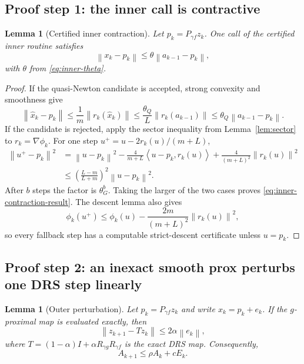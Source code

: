 \documentclass[10pt,leqno]{amsart}
\numberwithin{equation}{section}
\numberwithin{algorithm}{section}
\newtheorem{lemma}[theorem]{Lemma}
\theoremstyle{remark}
\newcommand{\norm}[1]{\left\lVert #1 \right\rVert}
\newcommand{\ip}[2]{\left\langle #1,#2 \right\rangle}
\newcommand{\grad}{\nabla}
\begin{document}
\subsection{Proof step 1: the inner call is contractive}

\begin{lemma}[Certified inner contraction]
\label{lem:certified-inner-contraction}
Let $p_k=P_{\gamma f}z_k$.  One call of the certified inner routine satisfies
\begin{equation}
\label{eq:inner-contraction-result}
    \norm{x_k-p_k}
    \le\theta\norm{a_{k-1}-p_k},
\end{equation}
with $\theta$ from \eqref{eq:inner-theta}.
\end{lemma}

\begin{proof}
If the quasi-Newton candidate is accepted, strong convexity and smoothness give
\[
    \norm{\widehat x_k-p_k}
    \le\frac1m\norm{r_k(\widehat x_k)}
    \le\frac{\theta_Q}{L}\norm{r_k(a_{k-1})}
    \le\theta_Q\norm{a_{k-1}-p_k}.
\]
If the candidate is rejected, apply the sector inequality from Lemma~\ref{lem:sector} to $r_k=\grad\phi_k$.  For one step $u^+=u-2r_k(u)/(m+L)$,
\[
\begin{aligned}
    \norm{u^+-p_k}^2
    &=\norm{u-p_k}^2
      -\frac{4}{m+L}\ip{u-p_k}{r_k(u)}
      +\frac{4}{(m+L)^2}\norm{r_k(u)}^2\\
    &\le\left(\frac{L-m}{L+m}\right)^2\norm{u-p_k}^2.
\end{aligned}
\]
After $b$ steps the factor is $\theta_G^b$.  Taking the larger of the two cases proves \eqref{eq:inner-contraction-result}.  The descent lemma also gives
\[
    \phi_k(u^+)\le\phi_k(u)
       -\frac{2m}{(m+L)^2}\norm{r_k(u)}^2,
\]
so every fallback step has a computable strict-descent certificate unless $u=p_k$.
\end{proof}

\subsection{Proof step 2: an inexact smooth prox perturbs one DRS step linearly}

\begin{lemma}[Outer perturbation]
\label{lem:outer-perturbation-focused}
Let $p_k=P_{\gamma f}z_k$ and write $x_k=p_k+e_k$.  If the $g$-proximal map is evaluated exactly, then
\begin{equation}
\label{eq:outer-perturb-focused}
    \norm{z_{k+1}-Tz_k}\le 2\alpha\norm{e_k},
\end{equation}
where $T=(1-\alpha)I+\alpha R_{\gamma g}R_{\gamma f}$ is the exact DRS map.  Consequently,
\begin{equation}
\label{eq:outer-error-focused}
    A_{k+1}\le\rho A_k+cE_k.
\end{equation}
\end{lemma}
\end{document}
